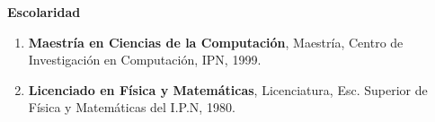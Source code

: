 {\large \textbf{Escolaridad}}


\hrulefill

\begin{enumerate}
\item \textbf{Maestría en Ciencias de la Computación}, Maestría, Centro de Investigación en Computación, IPN, 1999.

\item \textbf{Licenciado en Física y Matemáticas}, Licenciatura, Esc. Superior de Física y Matemáticas del I.P.N, 1980.
\end{enumerate}



